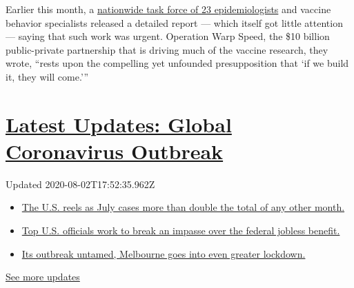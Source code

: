 Earlier this month, a
\href{https://www.centerforhealthsecurity.org/our-work/pubs_archive/pubs-pdfs/2020/200709-The-Publics-Role-in-COVID-19-Vaccination.pdf}{nationwide
task force of 23 epidemiologists} and vaccine behavior specialists
released a detailed report --- which itself got little attention ---
saying that such work was urgent. Operation Warp Speed, the \$10 billion
public-private partnership that is driving much of the vaccine research,
they wrote, ``rests upon the compelling yet unfounded presupposition
that `if we build it, they will come.'''

\hypertarget{latest-updates-global-coronavirus-outbreak}{%
\section{\texorpdfstring{\href{https://www.nytimes3xbfgragh.onion/2020/08/01/world/coronavirus-covid-19.html?action=click\&pgtype=Article\&state=default\&region=MAIN_CONTENT_1\&context=storylines_live_updates}{Latest
Updates: Global Coronavirus
Outbreak}}{Latest Updates: Global Coronavirus Outbreak}}\label{latest-updates-global-coronavirus-outbreak}}

Updated 2020-08-02T17:52:35.962Z

\begin{itemize}
\tightlist
\item
  \href{https://www.nytimes3xbfgragh.onion/2020/08/01/world/coronavirus-covid-19.html?action=click\&pgtype=Article\&state=default\&region=MAIN_CONTENT_1\&context=storylines_live_updates\#link-34047410}{The
  U.S. reels as July cases more than double the total of any other
  month.}
\item
  \href{https://www.nytimes3xbfgragh.onion/2020/08/01/world/coronavirus-covid-19.html?action=click\&pgtype=Article\&state=default\&region=MAIN_CONTENT_1\&context=storylines_live_updates\#link-780ec966}{Top
  U.S. officials work to break an impasse over the federal jobless
  benefit.}
\item
  \href{https://www.nytimes3xbfgragh.onion/2020/08/01/world/coronavirus-covid-19.html?action=click\&pgtype=Article\&state=default\&region=MAIN_CONTENT_1\&context=storylines_live_updates\#link-2bc8948}{Its
  outbreak untamed, Melbourne goes into even greater lockdown.}
\end{itemize}

\href{https://www.nytimes3xbfgragh.onion/2020/08/01/world/coronavirus-covid-19.html?action=click\&pgtype=Article\&state=default\&region=MAIN_CONTENT_1\&context=storylines_live_updates}{See
more updates}

